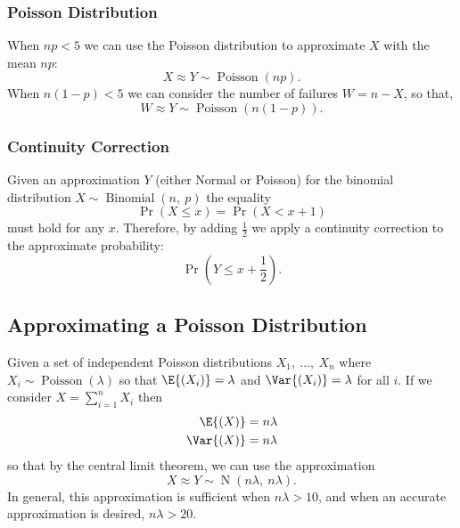 \documentclass{article}
\begin{document}
\subsubsection{Poisson Distribution}
When \(np < 5\) we can use the Poisson distribution to approximate
\(X\) with the mean \(np\):
\begin{equation*}
    X \approx Y \sim \operatorname{Poisson}{\left( np \right)}.
\end{equation*}
When \(n\left( 1 - p \right) < 5\) we can consider the number of failures \(W = n - X\), so that,
\begin{equation*}
    W \approx Y \sim \operatorname{Poisson}{\left( n\left( 1 - p \right) \right)}.
\end{equation*}
\subsubsection{Continuity Correction}
Given an approximation \(Y\) (either Normal or Poisson) for the
binomial distribution \(X \sim \operatorname{Binomial}{\left( n,\: p
\right)}\) the equality
\begin{equation*}
    \Pr{\left( X \leq x \right)} = \Pr{\left( X < x + 1 \right)}
\end{equation*}
must hold for any \(x\). Therefore, by adding \(\frac{1}{2}\) we apply a continuity correction to the approximate probability:
\begin{equation*}
    \Pr{\left( Y \leq x + \frac{1}{2} \right)}.
\end{equation*}
\subsection{Approximating a Poisson Distribution}
Given a set of independent Poisson distributions \(X_1,\: \ldots ,\:
X_n\) where \(X_i \sim \operatorname{Poisson}{\left( \lambda \right)}\)
so that \(\E{\left( X_i \right)} = \lambda\) and \(\Var{\left( X_i
\right)} = \lambda\) for all \(i\). If we consider \(X = \sum_{i = 1}^n
X_i\) then
\begin{align*}
    \E{\left( X \right)}   & = n \lambda \\
    \Var{\left( X \right)} & = n \lambda
\end{align*}
so that by the central limit theorem, we can use the approximation
\begin{equation*}
    X \approx Y \sim \operatorname{N}{\left( n\lambda,\: n\lambda \right)}.
\end{equation*}
In general, this approximation is sufficient when \(n \lambda > 10\), and when an accurate approximation is desired, \(n \lambda > 20\).
\end{document}
